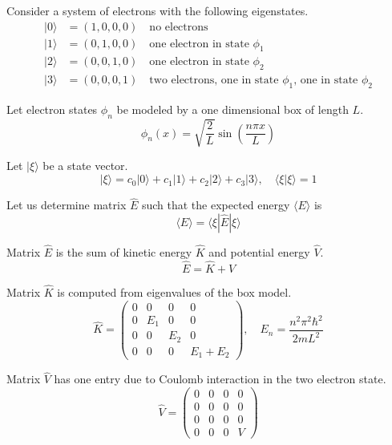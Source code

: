 \documentclass[12pt]{article}
\begin{document}
Consider a system of electrons with the following eigenstates.
\begin{align*}
|0\rangle&=(1,0,0,0)\quad\text{no electrons}\\
|1\rangle&=(0,1,0,0)\quad\text{one electron in state $\phi_1$}\\
|2\rangle&=(0,0,1,0)\quad\text{one electron in state $\phi_2$}\\
|3\rangle&=(0,0,0,1)\quad\text{two electrons, one in state $\phi_1$, one in state $\phi_2$}
\end{align*}

Let electron states $\phi_n$ be modeled by a one dimensional box of length $L$.
\begin{equation*}
\phi_n(x)=\sqrt{\frac{2}{L}}\sin\left(\frac{n\pi x}{L}\right)
\end{equation*}

Let $|\xi\rangle$ be a state vector.
\begin{equation*}
|\xi\rangle=c_0|0\rangle+c_1|1\rangle+c_2|2\rangle+c_3|3\rangle,\quad\langle\xi|\xi\rangle=1
\end{equation*}

Let us determine matrix $\hat{E}$ such that the expected
energy $\langle E \rangle$ is
\begin{equation*}
\langle E\rangle=\langle\xi|\hat{E}|\xi\rangle
\end{equation*}

Matrix $\hat{E}$ is the sum of kinetic energy $\hat K$ and potential energy $\hat V$.
\begin{equation*}
\hat{E}=\hat{K}+\hat{V}
\end{equation*}

Matrix $\hat{K}$ is computed from eigenvalues of the box model.
\begin{equation*}
\hat{K}=\begin{pmatrix}
0 & 0 & 0 & 0\\
0 & E_1 & 0 & 0\\
0 & 0 & E_2 & 0\\
0 & 0 & 0 & E_1+E_2
\end{pmatrix},
\quad
E_n=\frac{n^2\pi^2\hbar^2}{2mL^2}
\end{equation*}

Matrix $\hat{V}$ has one entry due to Coulomb interaction in the two electron state.
\begin{equation*}
\hat{V}=
\begin{pmatrix}
0 & 0 & 0 & 0\\
0 & 0 & 0 & 0\\
0 & 0 & 0 & 0\\
0 & 0 & 0 & V
\end{pmatrix}
\end{equation*}
\end{document}
